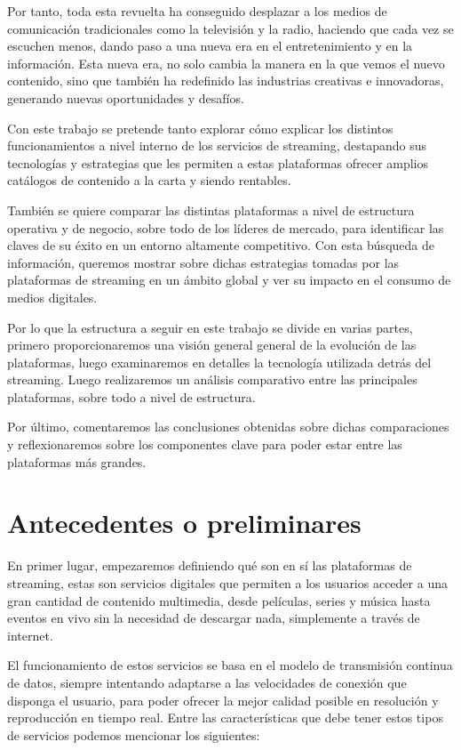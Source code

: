 \documentclass[12pt,a4paper]{article}
\begin{document}
Por tanto, toda esta revuelta ha conseguido desplazar a los medios de comunicación tradicionales como la televisión y la radio, haciendo que cada vez se escuchen menos, dando paso a una nueva era en el entretenimiento y en la información. Esta nueva era, no solo cambia la manera en la que vemos el nuevo contenido, sino que también ha redefinido las industrias creativas e innovadoras, generando nuevas oportunidades y desafíos.

Con este trabajo se pretende tanto explorar cómo explicar los distintos funcionamientos a nivel interno de los servicios de streaming, destapando sus tecnologías y estrategias que les permiten a estas plataformas ofrecer amplios catálogos de contenido a la carta y siendo rentables.

También se quiere comparar las distintas plataformas a nivel de estructura operativa y de negocio, sobre todo de los líderes de mercado, para identificar las claves de su éxito en un entorno altamente competitivo. Con esta búsqueda de información, queremos mostrar sobre dichas estrategias tomadas por las plataformas de streaming en un ámbito global y ver su impacto en el consumo de medios digitales.

Por lo que la estructura a seguir en este trabajo se divide en varias partes, primero proporcionaremos una visión general general de la evolución de las plataformas, luego examinaremos en detalles la tecnología utilizada detrás del streaming. Luego realizaremos un análisis comparativo entre las principales plataformas, sobre todo a nivel de estructura.

Por último, comentaremos las conclusiones obtenidas sobre dichas comparaciones y reflexionaremos sobre los componentes clave para poder estar entre las plataformas más grandes.
\newpage

\section{Antecedentes o preliminares}
En primer lugar, empezaremos definiendo qué son en sí las plataformas de streaming, estas son servicios digitales que permiten a los usuarios acceder a una gran cantidad de contenido multimedia, desde películas, series y música hasta eventos en vivo sin la necesidad de descargar nada, simplemente a través de internet.

El funcionamiento de estos servicios se basa en el modelo de transmisión continua de datos, siempre intentando adaptarse a las velocidades de conexión que disponga el usuario, para poder ofrecer la mejor calidad posible en resolución y reproducción en tiempo real. Entre las características que debe tener estos tipos de servicios podemos mencionar los siguientes:
\end{document}
